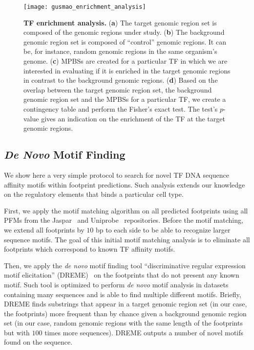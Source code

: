 \begin{figure}[h!]
\centering
\texttt{[image: gusmao\_enrichment\_analysis]}
\caption[TF enrichment analysis]{\textbf{TF enrichment analysis.} (\textbf{a}) The target genomic region set is composed of the genomic regions under study. (\textbf{b}) The background genomic region set is composed of ``control'' genomic regions. It can be, for instance, random genomic regions in the same organism's genome. (\textbf{c}) MPBSs are created for a particular TF in which we are interested in evaluating if it is enriched in the target genomic regions in contrast to the background genomic regions. (\textbf{d}) Based on the overlap between the target genomic region set, the background genomic region set and the MPBSs for a particular TF, we create a contingency table and perform the Fisher's exact test. The test's $p$-value gives an indication on the enrichment of the TF at the target genomic regions.}
\label{fig:gusmao_enrichment_analysis}
\end{figure}

\subsection{\emph{De Novo} Motif Finding}
\label{sec:denovo.motif.finding}

We show here a very simple protocol to search for novel TF DNA sequence affinity motifs within footprint predictions. Such analysis extends our knowledge on the regulatory elements that binds a particular cell type.

First, we apply the motif matching algorithm on all predicted footprints using all PFMs from the Jaspar~\citep{mathelier2014} and Uniprobe~\citep{robasky2011} repositories. Before the motif matching, we extend all footprints by $10$ bp to each side to be able to recognize larger sequence motifs. The goal of this initial motif matching analysis is to eliminate all footprints which correspond to known TF affinity motifs.

Then, we apply the \emph{de novo} motif finding tool ``discriminative regular expression motif elicitation'' (DREME)~\citep{bailey2011} on the footprints that do not present any known motif. Such tool is optimized to perform \emph{de novo} motif analysis in datasets containing many sequences and is able to find multiple different motifs. Briefly, DREME finds substrings that appear in a target genomic region set (in our case, the footprints) more frequent than by chance given a background genomic region set (in our case, random genomic regions with the same length of the footprints but with $100$ times more sequences). DREME outputs a number of novel motifs found on the sequence.

